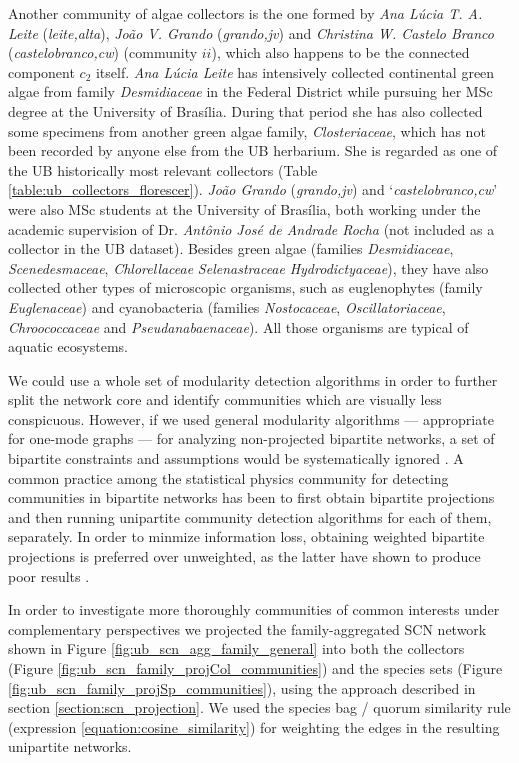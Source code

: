 Another community of algae collectors is the one formed by \textit{Ana Lúcia T. A. Leite} (\textit{leite,alta}), \textit{João V. Grando} (\textit{grando,jv}) and  \textit{Christina W. Castelo Branco} (\textit{castelobranco,cw}) (community $ii$), which also happens to be the connected component $c_2$ itself.
\textit{Ana Lúcia Leite} has intensively collected continental green algae from family \textit{Desmidiaceae} in the Federal District while pursuing her MSc degree at the University of Brasília.
During that period she has also collected some specimens from another green algae family, \textit{Closteriaceae}, which has not been recorded by anyone else from the UB herbarium.
She is regarded as one of the UB historically most relevant collectors (Table \ref{table:ub_collectors_florescer}).
%
\textit{João Grando} (\textit{grando,jv}) and `\textit{castelobranco,cw}' were also MSc students at the University of Brasília, both working under the academic supervision of Dr. \textit{Antônio José de Andrade Rocha} (not included as a collector in the UB dataset).
Besides green algae (families \textit{Desmidiaceae}, \textit{Scenedesmaceae}, \textit{Chlorellaceae} \textit{Selenastraceae} \textit{Hydrodictyaceae}), they have also collected other types of microscopic organisms, such as euglenophytes (family \textit{Euglenaceae}) and cyanobacteria (families \textit{Nostocaceae}, \textit{Oscillatoriaceae}, \textit{Chroococcaceae} and \textit{Pseudanabaenaceae}). 
All those organisms are typical of aquatic ecosystems.
 

We could use a whole set of modularity detection algorithms in order to further split the network core and identify communities which are visually less conspicuous. 
However, if we used general modularity algorithms --- appropriate for one-mode graphs --- for analyzing non-projected bipartite networks, a set of bipartite constraints and assumptions would be systematically ignored \cite{Borgatti2015}.
A common practice among the statistical physics community for detecting communities in bipartite networks has been to first obtain bipartite projections and then running unipartite community detection algorithms for each of them, separately.
In order to minmize information loss, obtaining weighted bipartite projections is preferred over unweighted, as the latter have shown to produce poor results \cite{Guimera2007}.

In order to investigate more thoroughly communities of common interests under complementary perspectives we projected the family-aggregated SCN network shown in Figure \ref{fig:ub_scn_agg_family_general} into both the collectors (Figure \ref{fig:ub_scn_family_projCol_communities}) and the species sets (Figure \ref{fig:ub_scn_family_projSp_communities}), using the approach described in section \ref{section:scn_projection}.
We used the species bag / quorum similarity rule (expression \ref{equation:cosine_similarity}) for weighting the edges in the resulting unipartite networks.


